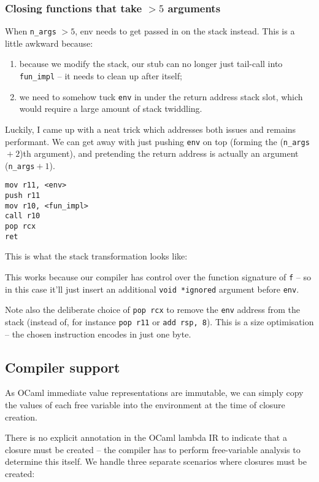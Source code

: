 \documentclass[12pt,a4paper,twoside,openright]{report}
\begin{document}
\subsubsection{Closing functions that take $> 5$ arguments}

When \lstinline{n_args} $> 5$, env needs to get passed in on the stack instead.
This is a little awkward because:
\begin{enumerate}
    \item because we modify the stack, our stub can no longer just tail-call into \lstinline{fun_impl} -- it needs to clean up after itself;
  \item we need to somehow tuck \lstinline{env} in under the return address stack slot, which would require a large amount of stack twiddling.
\end{enumerate}

Luckily, I came up with a neat trick which addresses both issues and remains performant. We can get away with just pushing \lstinline{env} on top (forming the (\lstinline{n_args}${}+2$)th argument), and pretending the return address is actually an argument (\lstinline{n_args}${}+1$).

\begin{lstlisting}
mov r11, <env>
push r11
mov r10, <fun_impl>
call r10
pop rcx
ret
\end{lstlisting}

This is what the stack transformation looks like: %

This works because our compiler has control over the function signature of
\lstinline{f}
-- so in this case it'll just insert an additional \lstinline{void *ignored} argument before \lstinline{env}.

Note also the deliberate choice of \lstinline{pop rcx} to remove the \lstinline{env} address from the stack (instead of, for instance \lstinline{pop r11} or \lstinline{add rsp, 8}). This is a size optimisation -- the chosen instruction encodes in just one byte.

\subsection{Compiler support}

As OCaml immediate value representations are immutable, we can simply copy the values of each free variable into the environment at the time of closure creation.

There is no explicit annotation in the OCaml lambda IR to indicate that a closure must be created -- the compiler has to perform free-variable analysis to determine this itself. We handle three separate scenarios where closures must be created:
\end{document}
